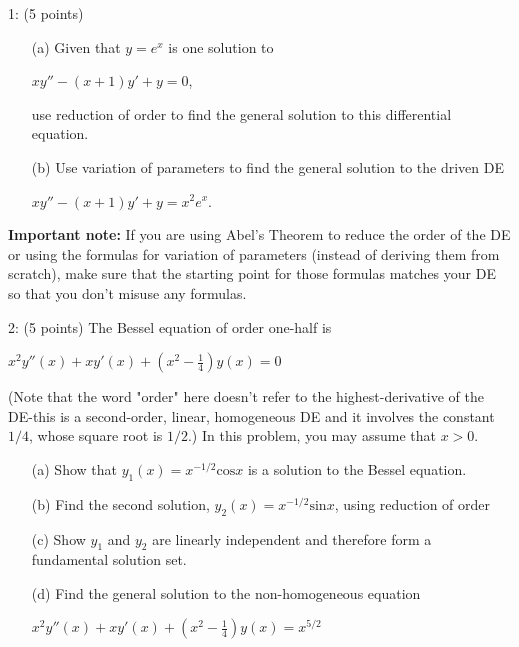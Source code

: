 \documentclass[12pt,letterpaper]{hmcpset}
\begin{document}
\begin{problem}
1: (5 points) 
\begin{enumerate}
    \item[(a)] 
    Given that $y = e^x$ is one solution to
\begin{center}
    $xy'' - (x + 1)y' + y = 0$,
\end{center}
use reduction of order to find the general solution to this differential equation.
    \item[(b)] 
    Use variation of parameters to find the general solution to the driven DE
\begin{center}
    $xy'' - (x + 1)y' + y = x^2e^x$.
\end{center}

\end{enumerate}

\textbf{Important note:} If you are using Abel's Theorem to reduce the order of the DE or using
the formulas for variation of parameters (instead of deriving them from scratch), make sure
that the starting point for those formulas matches your DE so that you don’t misuse any
formulas.
\end{problem}
\newpage

\begin{problem}
2: (5 points) The Bessel equation of order one-half is
\begin{center}
   $x^2y''(x)+xy'(x)+\left( x^2-\frac{1}{4}\right)y(x)=0$
\end{center}

(Note that the word "order" here doesn't refer to the highest-derivative of the DE-this is
a second-order, linear, homogeneous DE and it involves the constant $1/4$, whose square root
is $1/2$.) In this problem, you may assume that $x > 0$.

\begin{enumerate}
    \item[(a)] Show that $y_1(x) = x^{-1/2}\text{cos}x$ is a solution to the Bessel equation.
    \item[(b)] Find the second solution, $y_2(x) = x^{-1/2}\text{sin}x$, using reduction of order
    \item[(c)] Show $y_1$ and $y_2$ are linearly independent and therefore form a fundamental solution set.
    \item[(d)] Find the general solution to the non-homogeneous equation
    
    \begin{center}
   $x^2y''(x)+xy'(x)+\left( x^2-\frac{1}{4}\right)y(x)=x^{5/2}$
    \end{center}
\end{enumerate}
\end{problem}
\newpage
\end{document}
